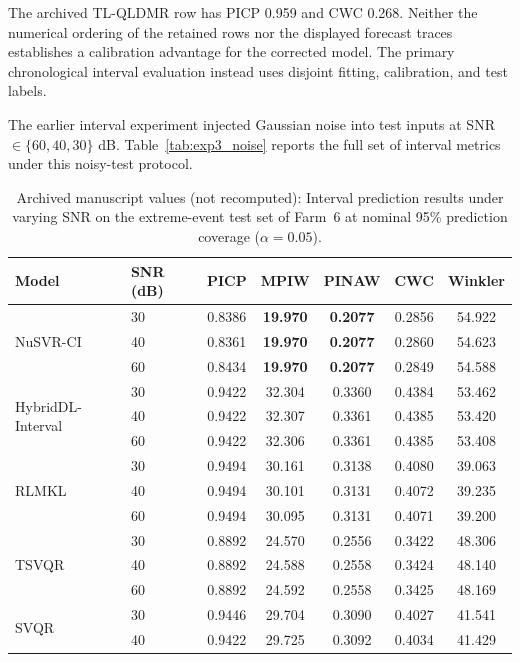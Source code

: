 {\color{blue}The archived TL-QLDMR row has PICP 0.959 and CWC 0.268. Neither the numerical ordering of the retained rows nor the displayed forecast traces establishes a calibration advantage for the corrected model. The primary chronological interval evaluation instead uses disjoint fitting, calibration, and test labels.}


The earlier interval experiment injected Gaussian noise into test inputs at SNR $\in \{60,40,30\}$ dB.
Table~\ref{tab:exp3_noise} reports the full set of interval metrics under this noisy-test protocol.

\FloatBarrier

\begin{table}[ht]
\centering
\caption{{\color{blue}Archived manuscript values (not recomputed): }Interval prediction results under varying SNR on the extreme-event test set of Farm~6 at nominal 95\% prediction coverage ($\alpha = 0.05$).}
\setlength{\tabcolsep}{3.0mm}
\begin{tabular}{llccccc}
\toprule
Model & SNR (dB) & PICP & MPIW & PINAW & CWC & Winkler \\
\midrule
\multirow{3}{*}{NuSVR-CI}
  & 30 & 0.8386 & \textbf{19.970} & \textbf{0.2077} & 0.2856 & 54.922 \\
  & 40 & 0.8361 & \textbf{19.970} & \textbf{0.2077} & 0.2860 & 54.623 \\
  & 60 & 0.8434 & \textbf{19.970} & \textbf{0.2077} & 0.2849 & 54.588 \\
\multirow{3}{*}{HybridDL-Interval}
  & 30 & 0.9422 & 32.304 & 0.3360 & 0.4384 & 53.462 \\
  & 40 & 0.9422 & 32.307 & 0.3361 & 0.4385 & 53.420 \\
  & 60 & 0.9422 & 32.306 & 0.3361 & 0.4385 & 53.408 \\
\multirow{3}{*}{RLMKL}
  & 30 & 0.9494 & 30.161 & 0.3138 & 0.4080 & 39.063 \\
  & 40 & 0.9494 & 30.101 & 0.3131 & 0.4072 & 39.235 \\
  & 60 & 0.9494 & 30.095 & 0.3131 & 0.4071 & 39.200 \\
\multirow{3}{*}{TSVQR}
  & 30 & 0.8892 & 24.570 & 0.2556 & 0.3422 & 48.306 \\
  & 40 & 0.8892 & 24.588 & 0.2558 & 0.3424 & 48.140 \\
  & 60 & 0.8892 & 24.592 & 0.2558 & 0.3425 & 48.169 \\
\multirow{3}{*}{SVQR}
  & 30 & 0.9446 & 29.704 & 0.3090 & 0.4027 & 41.541 \\
  & 40 & 0.9422 & 29.725 & 0.3092 & 0.4034 & 41.429 \\

\end{tabular}
\end{table}
